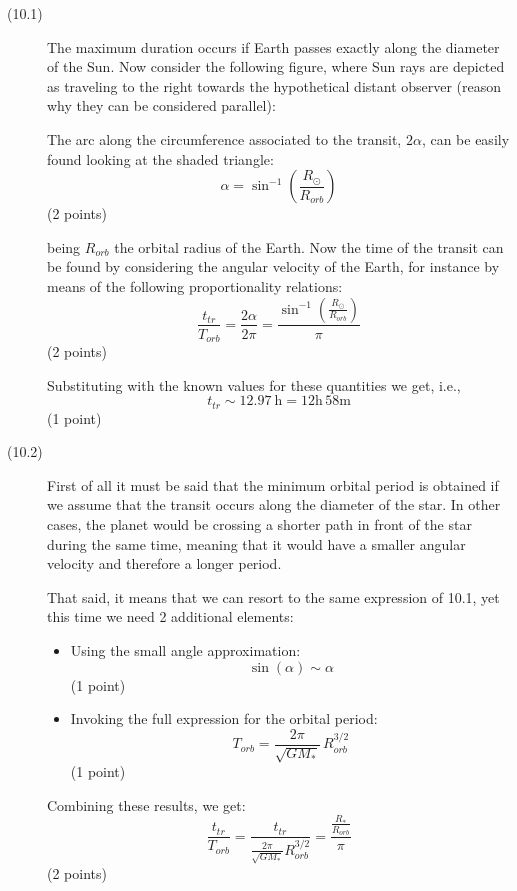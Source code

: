 \begin{description}
\item[(10.1)] The maximum duration occurs if Earth passes exactly along the
diameter of the Sun. Now consider the following figure, where Sun rays are
depicted as traveling to the right towards the hypothetical distant observer
(reason why they can be considered parallel):

The arc along the circumference associated to the transit, $2\alpha$, can be
easily found looking at the shaded triangle:
\[ \alpha = \sin^{-1}\!\left(\frac{R_\odot}{R_{orb}}\right) \]
\hfill(2 points)

being $R_{orb}$ the orbital radius of the Earth. Now the time of the transit
can be found by considering the angular velocity of the Earth, for instance by
means of the following proportionality relations:
\[ \frac{t_{tr}}{T_{orb}} = \frac{2\alpha}{2\pi}
   = \frac{\sin^{-1}\!\left(\frac{R_\odot}{R_{orb}}\right)}{\pi} \]
\hfill(2 points)

Substituting with the known values for these quantities we get, i.e.,
\[ t_{tr} \sim 12.97\ \mathrm{h} = 12\mathrm{h}\,58\mathrm{m} \]
\hfill(1 point)

\item[(10.2)] First of all it must be said that the minimum orbital period is
obtained if we assume that the transit occurs along the diameter of the star.
In other cases, the planet would be crossing a shorter path in front of the
star during the same time, meaning that it would have a smaller angular
velocity and therefore a longer period.

That said, it means that we can resort to the same expression of 10.1, yet
this time we need 2 additional elements:
\begin{itemize}
\item Using the small angle approximation:
\[ \sin(\alpha) \sim \alpha \]
\hfill(1 point)
\item Invoking the full expression for the orbital period:
\[ T_{orb} = \frac{2\pi}{\sqrt{GM_*}}\,R_{orb}^{3/2} \]
\hfill(1 point)
\end{itemize}

Combining these results, we get:
\[ \frac{t_{tr}}{T_{orb}}
   = \frac{t_{tr}}{\frac{2\pi}{\sqrt{GM_*}}R_{orb}^{3/2}}
   = \frac{\frac{R_*}{R_{orb}}}{\pi} \]
\hfill(2 points)


\end{description}
